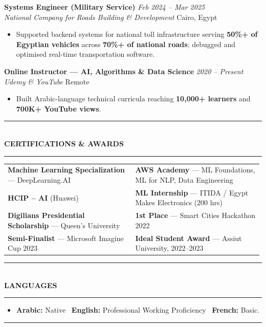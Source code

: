 \documentclass[10pt, a4paper]{article}
\makeatletter
\newcommand{\cvsection}[1]{%
  \vspace{3pt}%
  {\color{navy}\rule{\linewidth}{1.1pt}}\\[0.5pt]%
  {\color{navy}\bfseries\fontsize{9.5}{11}\selectfont\uppercase{#1}}\\[-4pt]%
  {\color{teal}\rule{\linewidth}{0.6pt}}%
  \vspace{2pt}%
}
\newcommand{\cventry}[4]{%
  \vspace{2.5pt}%
  \textbf{\color{darkgray}#1} \hfill {\color{midgray}\textit{#3}}\\[-1.5pt]%
  {\color{teal}\textit{#2}} \hfill {\color{midgray}#4}%
}
\newenvironment{cvitems}{%
  \begin{itemize}[leftmargin=11pt, itemsep=0.5pt, parsep=0pt, topsep=1pt,
                  label={\textcolor{teal}{$\bullet$}}]
}{%
  \end{itemize}%
}
\newenvironment{dualcol}{%
  \begin{tabular*}{\linewidth}{@{}p{0.495\linewidth}@{\hspace{0.01\linewidth}}p{0.495\linewidth}@{}}
}{%
  \end{tabular*}%
}
\makeatother
\begin{document}
\cventry{Systems Engineer (Military Service)}{National Company for Roads Building \& Development}
        {Feb 2024 -- Mar 2025}{Cairo, Egypt}
\begin{cvitems}
  \item Supported backend systems for national toll infrastructure serving \textbf{50\%+ of Egyptian vehicles} across \textbf{70\%+ of national roads}; debugged and optimised real-time transportation software.
\end{cvitems}

\cventry{Online Instructor --- AI, Algorithms \& Data Science}{Udemy \& YouTube}
        {2020 -- Present}{Remote}
\begin{cvitems}
  \item Built Arabic-language technical curricula reaching \textbf{10,000+ learners} and \textbf{700K+ YouTube views}.
\end{cvitems}

\cvsection{Certifications \& Awards}

\begin{dualcol}
  \textbf{Machine Learning Specialization} --- DeepLearning.AI &
  \textbf{AWS Academy} --- ML Foundations, ML for NLP, Data Engineering \\[2pt]
  \textbf{HCIP -- AI} (Huawei) &
  \textbf{ML Internship} --- ITIDA / Egypt Makes Electronics (200 hrs) \\[2pt]
  \textbf{Digilians Presidential Scholarship} --- Queen's University &
  \textbf{1st Place} --- Smart Cities Hackathon 2022 \\[2pt]
  \textbf{Semi-Finalist} --- Microsoft Imagine Cup 2023 &
  \textbf{Ideal Student Award} --- Assiut University, 2022--2023 \\
\end{dualcol}

\cvsection{Languages}

\begin{cvitems}
  \item \textbf{Arabic:} Native \textperiodcentered\ \textbf{English:} Professional Working Proficiency \textperiodcentered\ \textbf{French:} Basic.
\end{cvitems}

\vspace{3pt}
{\color{navy}\rule{\linewidth}{0.8pt}}
\end{document}
